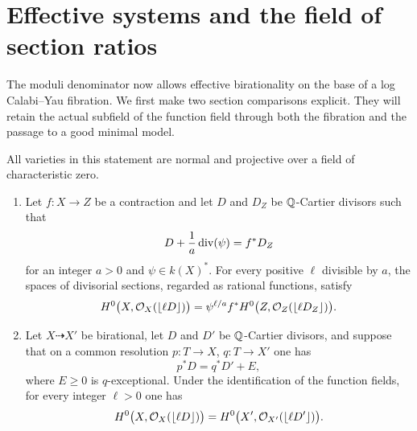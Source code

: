 \section{Effective systems and the field of section ratios}
\label{sec:completion}

The moduli denominator now allows effective birationality on the base
of a log Calabi--Yau fibration.  We first make two section comparisons
explicit.  They will retain the actual subfield of the function field
through both the fibration and the passage to a good minimal model.

\begin{lemma}\label{lem:rounded-comparison}
All varieties in this statement are normal and projective over a field
of characteristic zero.
\begin{enumerate}
\item
Let $f:X\to Z$ be a contraction and let $D$ and $D_Z$ be
$\mathbb Q$-Cartier divisors such that
\[
 D+\frac1a\operatorname{div}(\psi)=f^*D_Z
\]
for an integer $a>0$ and $\psi\in k(X)^*$.  For every positive $\ell$ divisible
by $a$, the spaces of divisorial sections, regarded as rational
functions, satisfy
\begin{equation}\label{eq:section-pullback}
 H^0\bigl(X,\mathcal O_X(\left\lfloor \ell D\right\rfloor)\bigr)
 =\psi^{\ell/a}f^*H^0\bigl(Z,\mathcal O_Z(\left\lfloor \ell D_Z\right\rfloor)\bigr).
\end{equation}
\item
Let $X\dashrightarrow X'$ be birational, let $D$ and $D'$ be
$\mathbb Q$-Cartier divisors, and suppose that on a common resolution
$p:T\to X$, $q:T\to X'$ one has
\[
 p^*D=q^*D'+E,
\]
where $E\geq0$ is $q$-exceptional.  Under the identification of the
function fields, for every integer $\ell>0$ one has
\begin{equation}\label{eq:section-birational}
 H^0\bigl(X,\mathcal O_X(\left\lfloor \ell D\right\rfloor)\bigr)
 =H^0\bigl(X',\mathcal O_{X'}(\left\lfloor \ell D'\right\rfloor)\bigr).
\end{equation}
\end{enumerate}
\end{lemma}

